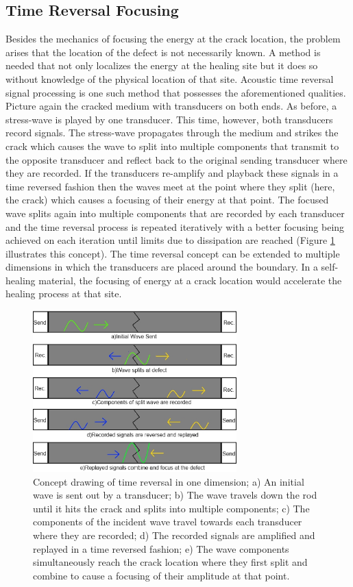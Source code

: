 \subsection{Time Reversal Focusing}
Besides the mechanics of focusing the energy at the crack location, the problem arises that the location of the defect is not necessarily known. A method is needed that not only localizes the energy at the healing site but it does so without knowledge of the physical location of that site. Acoustic time reversal signal processing is one such method that possesses the aforementioned qualities. Picture again the cracked medium with transducers on both ends. As before, a stress-wave is played by one transducer. This time, however, both transducers record signals. The stress-wave propagates through the medium and strikes the crack which causes the wave to split into multiple components that transmit to the opposite transducer and reflect back to the original sending transducer where they are recorded. If the transducers re-amplify and playback these signals in a time reversed fashion then the waves meet at the point where they split (here, the crack) which causes a focusing of their energy at that point. The focused wave splits again into multiple components that are recorded by each transducer and the time reversal process is repeated iteratively with a better focusing being achieved on each iteration until limits due to dissipation are reached (Figure \ref{fig:trDrawing} illustrates this concept). The time reversal concept can be extended to multiple dimensions in which the transducers are placed around the boundary. In a self-healing material, the focusing of energy at a crack location would accelerate the healing process at that site.

\begin{figure}[ht!]
\centering
\includegraphics[width=0.7\textwidth]{eps_pics/trDrawing}
\caption{ Concept drawing of time reversal in one dimension; a) An initial wave is sent out by a transducer; b) The wave travels down the rod until it hits the crack and splits into multiple components; c) The components of the incident wave travel towards each transducer where they are recorded; d) The recorded signals are amplified and replayed in a time reversed fashion; e) The wave components simultaneously reach the crack location where they first split and combine to cause a focusing of their amplitude at that point.
	 \label{fig:trDrawing}} 
\end{figure}

